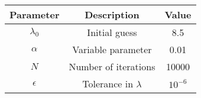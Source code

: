 
\begin{center}
\begin{tabular}{|c|c|c|}
\hline
\textbf{Parameter}& \textbf{Description} &\textbf{Value}\\ \hline
$\lambda_0$		 &	Initial guess& 8.5 \\ \hline
$\alpha $		 &	Variable parameter & 0.01\\ \hline
$N$		 	     &  Number of iterations &   10000\\ \hline
$\epsilon$		 &  Tolerance in $\lambda$	& $10^{-6}$ \\ \hline
\end{tabular}
\end{center}
